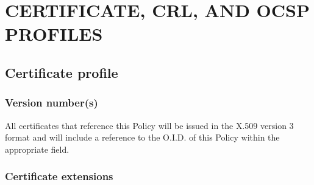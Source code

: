 
\chapter{CERTIFICATE, CRL, AND OCSP PROFILES}
\section{Certificate profile}
\subsection{Version number(s)}

All certificates that reference this Policy will be issued in the X.509 version 3 format and will include a reference to the O.I.D. of this Policy within the appropriate field. 

\subsection{Certificate extensions}

